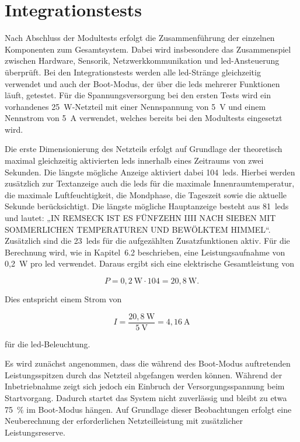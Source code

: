 \section{Integrationstests}
Nach Abschluss der Modultests erfolgt die Zusammenführung der einzelnen Komponenten zum Gesamtsystem.  
Dabei wird insbesondere das Zusammenspiel zwischen Hardware, Sensorik, Netzwerkkommunikation und \gls{led}-Ansteuerung überprüft.  
Bei den Integrationstests werden alle \gls{led}-Stränge gleichzeitig verwendet und auch der Boot-Modus, der über die \gls{led}s mehrerer Funktionen läuft, getestet.  
Für die Spannungsversorgung bei den ersten Tests wird ein vorhandenes 25~W-Netzteil mit einer Nennspannung von 5~V und einem Nennstrom von 5~A verwendet, welches bereits bei den Modultests eingesetzt wird.  

Die erste Dimensionierung des Netzteils erfolgt auf Grundlage der theoretisch maximal gleichzeitig aktivierten \gls{led}s innerhalb eines Zeitraums von zwei Sekunden.  
Die längste mögliche Anzeige aktiviert dabei 104~\gls{led}s.  
Hierbei werden zusätzlich zur Textanzeige auch die \gls{led}s für die maximale Innenraumtemperatur, die maximale Luftfeuchtigkeit, die Mondphase, die Tageszeit sowie die aktuelle Sekunde berücksichtigt.  
Die längste mögliche Hauptanzeige besteht aus 81~\gls{led}s und lautet: „IN REMSECK IST ES FÜNFZEHN IIII NACH SIEBEN MIT SOMMERLICHEN TEMPERATUREN UND BEWÖLKTEM HIMMEL“.  
Zusätzlich sind die 23~\gls{led}s für die aufgezählten Zusatzfunktionen aktiv.  
Für die Berechnung wird, wie in Kapitel~6.2 beschrieben, eine Leistungsaufnahme von 0{,}2~W pro \gls{led} verwendet.  
Daraus ergibt sich eine elektrische Gesamtleistung von

\[
P = 0{,}2~\mathrm{W} \cdot 104 = 20{,}8~\mathrm{W}.
\]

Dies entspricht einem Strom von

\[
I = \frac{20{,}8~\mathrm{W}}{5~\mathrm{V}} = 4{,}16~\mathrm{A}
\]

für die \gls{led}-Beleuchtung.  

Es wird zunächst angenommen, dass die während des Boot-Modus auftretenden Leistungsspitzen durch das Netzteil abgefangen werden können.  
Während der Inbetriebnahme zeigt sich jedoch ein Einbruch der Versorgungsspannung beim Startvorgang. 
Dadurch startet das System nicht zuverlässig und bleibt zu etwa 75~\% im Boot-Modus hängen.  
Auf Grundlage dieser Beobachtungen erfolgt eine Neuberechnung der erforderlichen Netzteilleistung mit zusätzlicher Leistungsreserve.  


